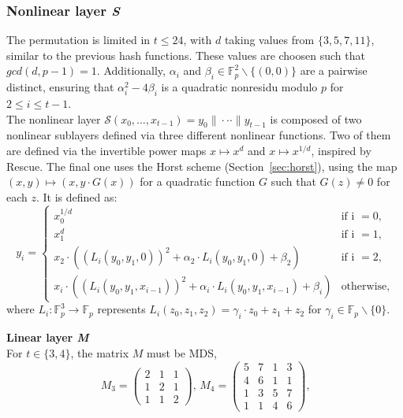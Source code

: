 \subsubsection*{Nonlinear layer \textit{S}}
The permutation is limited in $t \leq 24$, with $d$ taking values from $\{3,5,7,11\}$, similar to the previous hash functions. These values are choosen such that $gcd(d,p-1) = 1$. Additionally, $\alpha_i$ and $\beta_i \in \mathbb{F}_{p}^2 \backslash\{(0,0)\}$ are a pairwise distinct, ensuring that $\alpha_i^2 - 4\beta_i$ is a quadratic nonresidu modulo $p$ for $2\leq i \leq t-1$.\\
The nonlinear layer $\mathcal{S}(x_0,\dots,x_{t-1}) = y_0 \| \cdot\cdot\cdot\|y_{t-1}$ is composed of two nonlinear sublayers defined via three different nonlinear functions. Two of them are defined via the invertible power maps $x\mapsto x^d$ and $x\mapsto x^{1/d}$, inspired by Rescue. The final one uses the Horst scheme (Section~\ref{sec:horst}), using the map $(x,y)\mapsto(x,y\cdot G(x))$ for a quadratic function $G$ such that $G(z)\neq0$ for each $z$. It is defined as:
\begin{equation}
    y_i = \begin{cases}
        x_0^{1/d} & \text{if i } = 0, \\
        x_1^d & \text{if i } = 1, \\
        x_2 \cdot \left(\left(L_i\left(y_0,y_1,0\right)\right)^2 + \alpha_2 \cdot L_i\left(y_0,y_1,0\right)+ \beta_2\right) & \text{if i } = 2, \\
        x_i \cdot \left(\left(L_i\left(y_0,y_1,x_{i-1}\right)\right)^2 + \alpha_i \cdot L_i\left(y_0,y_1,x_{i-1}\right) + \beta_i\right) & \text{otherwise},  
    \end{cases}
\end{equation}
where $L_i : \mathbb{F}_{p}^3 \longrightarrow \mathbb{F}_{p}$ represents $L_i\left(z_0,z_1,z_2\right) = \gamma_i \cdot z_0 + z_1 + z_2$ for $\gamma_i \in \mathbb{F}_{p} \backslash \{0\}$.

\textbf{Linear layer \textit{M}}\\
For $t \in \{3,4\}$, the matrix $M$ must be MDS,
\begin{equation}
    M_3 = 
    \begin{pmatrix}
        2 & 1 & 1 \\
        1 & 2 & 1 \\
        1 & 1 & 2 
    \end{pmatrix}
    \text{, } M_4 = 
    \begin{pmatrix}
        5 & 7 & 1 & 3 \\
        4 & 6 & 1 & 1 \\
        1 & 3 & 5 & 7 \\
        1 & 1 & 4 & 6
    \end{pmatrix}
    \text{,}
\end{equation}

